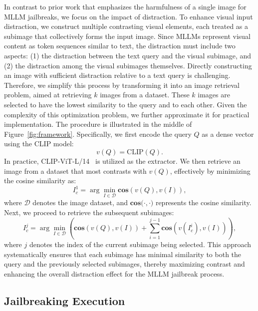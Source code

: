 In contrast to prior work that emphasizes the harmfulness of a single image for MLLM jailbreaks, we focus on the impact of distraction. To enhance visual input distraction, we construct multiple contrasting visual elements, each treated as a subimage that collectively forms the input image. Since MLLMs represent visual content as token sequences similar to text, the distraction must include two aspects: (1) the distraction between the text query and the visual subimage, and (2) the distraction among the visual subimages themselves. Directly constructing an image with sufficient distraction relative to a text query is challenging. Therefore, we simplify this process by transforming it into an image retrieval problem, aimed at retrieving $k$ images from a dataset. These $k$ images are selected to have the lowest similarity to the query and to each other. Given the complexity of this optimization problem, we further approximate it for practical implementation.
The procedure is illustrated in the middle of Figure~\ref{fig:framework}.
Specifically, we first encode the query $Q$ as a dense vector using the CLIP model:
\begin{equation}
    v(Q)= \text{CLIP}(Q).
\end{equation}
In practice, CLIP-ViT-L/14~\cite{radford2021learning} is utilized as the extractor. We then retrieve an image from a dataset that most contrasts with $v(Q)$, effectively by minimizing the cosine similarity as:
\begin{equation}
I_c^1 = \arg \min_{I \in \mathcal{D}} \textbf{cos}(v(Q), v(I)),
\end{equation}
where $\mathcal{D}$ denotes the image dataset, and $\textbf{cos($\cdot,\cdot$)}$ represents the cosine similarity. Next, we proceed to retrieve the subsequent subimages:
\begin{equation}
I_{c}^{j} = \arg \min_{I \in \mathcal{D}} \left( \textbf{cos}(v(Q), v(I)) + \sum_{i=1}^{j-1} \textbf{cos}\left( v(I_c^i), v(I)\right) \right),
\end{equation}
where $j$ denotes the index of the current subimage being selected. This approach systematically ensures that each subimage has minimal similarity to both the query and the previously selected subimages, thereby maximizing contrast and enhancing the overall distraction effect for the MLLM jailbreak process.



\subsection{Jailbreaking Execution}
\label{sec:jail_exec}


